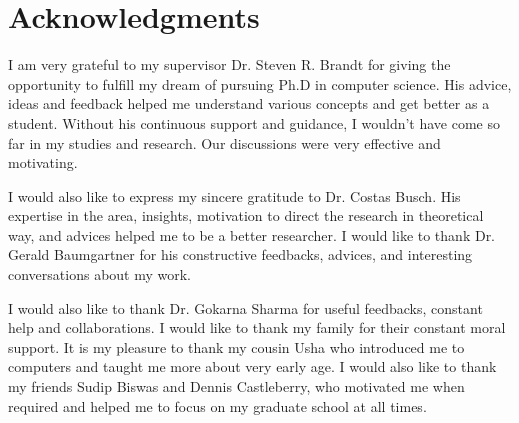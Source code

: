 \chapter*{Acknowledgments}
\label{ch:Acknowledgments}

I am very grateful to my supervisor Dr. Steven R. Brandt for giving the opportunity to fulfill my dream of pursuing Ph.D in computer science. His advice, ideas and feedback helped me understand various concepts and get better as a student. Without his continuous support and guidance, I wouldn't have come so far in my studies and research. Our discussions were very effective and motivating.

I would also like to express my sincere gratitude to 
Dr. Costas Busch. His expertise in the area, insights, motivation to direct the research in theoretical way,
and advices helped me to be a better researcher. I would like to thank Dr. Gerald Baumgartner for his constructive feedbacks, advices, and interesting conversations about my work.

I would also like to thank Dr. Gokarna Sharma for useful feedbacks, constant help and collaborations. I would like to thank my family for their constant moral support. It is  my pleasure to thank my cousin Usha who introduced me to computers and taught me more about very early age. I would also like to thank my friends Sudip Biswas and Dennis Castleberry, who motivated me when required and helped me to focus on my graduate school at all times.



